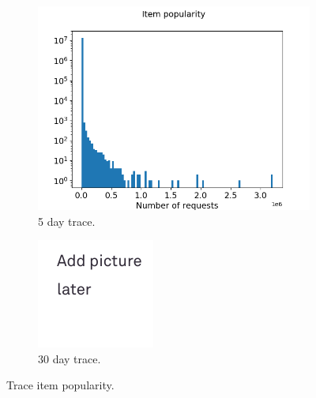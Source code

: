 \begin{figure}[b!]
	\centering
	
	\begin{subfigure}[b]{0.49\linewidth}
		\includegraphics[width=\linewidth]{pics/real_item_pop.png}
		\caption{5 day trace.}
	\end{subfigure}
	\begin{subfigure}[b]{0.49\linewidth}
		\includegraphics[width=\linewidth]{pics/todo.png}
		\caption{30 day trace.}
	\end{subfigure}
	\caption{Trace item popularity.}
	\label{fig:pop_1}
\end{figure}

